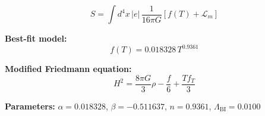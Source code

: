 
\begin{equation}
  S = \int d^4x \, |e| \, \frac{1}{16\pi G} \left[ f(T) + \mathcal{L}_m \right]
\end{equation}

\textbf{Best-fit model:}
\begin{equation}
  f(T) = 0.018328 \, T^{0.9361}
\end{equation}

\textbf{Modified Friedmann equation:}
\begin{equation}
  H^2 = \frac{8\pi G}{3} \rho - \frac{f}{6} + \frac{T f_T}{3}
\end{equation}

\textbf{Parameters:}
$\alpha = 0.018328$, \quad
$\beta = -0.511637$, \quad
$n = 0.9361$, \quad
$\Lambda_{\text{BI}} = 0.0100$